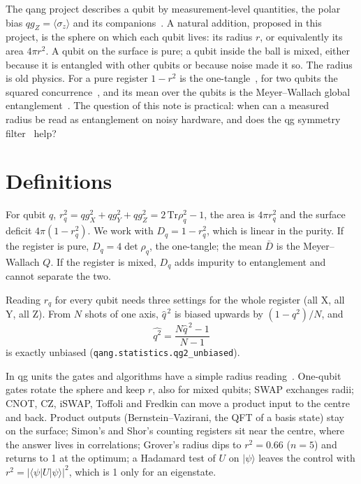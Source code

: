 \documentclass[11pt]{article}
\newcommand{\qZ}{qg_Z}
\newcommand{\qX}{qg_X}
\newcommand{\qY}{qg_Y}
\begin{document}
The qang project describes a qubit by measurement-level quantities, the polar bias $\qZ=\langle\sigma_z\rangle$ and its
companions~\cite{monteverde2026qang}. A natural addition, proposed in this project, is the sphere on which each qubit
lives: its radius $r$, or equivalently its area $4\pi r^2$. A qubit on the surface is pure; a qubit inside the ball is
mixed, either because it is entangled with other qubits or because noise made it so. The radius is old physics. For a
pure register $1-r^2$ is the one-tangle~\cite{coffman2000}, for two qubits the squared
concurrence~\cite{wootters1998}, and its mean over the qubits is the Meyer--Wallach global
entanglement~\cite{meyer2002,brennen2003}. The question of this note is practical: when can a measured radius be read as
entanglement on noisy hardware, and does the qg symmetry filter~\cite{monteverde2026witness} help?

\section{Definitions}

For qubit $q$, $r_q^2=\qX^2+\qY^2+\qZ^2=2\,\mathrm{Tr}\rho_q^2-1$, the area is $4\pi r_q^2$ and the surface deficit
$4\pi(1-r_q^2)$. We work with $D_q=1-r_q^2$, which is linear in the purity. If the register is pure,
$D_q=4\det\rho_q$, the one-tangle; the mean $\bar D$ is the Meyer--Wallach $Q$. If the register is mixed, $D_q$ adds
impurity to entanglement and cannot separate the two.

Reading $r_q$ for every qubit needs three settings for the whole register (all X, all Y, all Z). From $N$ shots of one
axis, $\hat q^{\,2}$ is biased upwards by $(1-q^2)/N$, and
\begin{equation}\label{eq:unbiased}
\widehat{q^2}=\frac{N\hat q^{\,2}-1}{N-1}
\end{equation}
is exactly unbiased (\texttt{qang.statistics.qg2\_unbiased}).

In qg units the gates and algorithms have a simple radius
reading~\cite{monteverde2026formulation}. One-qubit gates rotate the sphere and keep $r$, also for mixed qubits; SWAP
exchanges radii; CNOT, CZ, iSWAP, Toffoli and Fredkin can move a product input to the centre and back. Product outputs
(Bernstein--Vazirani, the QFT of a basis state) stay on the surface; Simon's and Shor's counting registers sit near the
centre, where the answer lives in correlations; Grover's radius dips to $r^2=0.66$ ($n=5$) and returns to 1 at the
optimum; a Hadamard test of $U$ on $|\psi\rangle$ leaves the control with $r^2=|\langle\psi|U|\psi\rangle|^2$, which is
1 only for an eigenstate.
\end{document}
